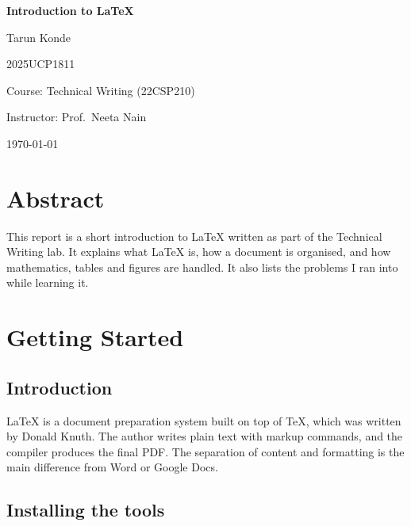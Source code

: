 \documentclass[12pt,a4paper]{report}
\begin{document}
\begin{titlepage}
    \thispagestyle{empty}
    \centering
    \vspace*{3cm}
    {\Huge\bfseries Introduction to \LaTeX\par}
    \vspace{2cm}
    {\Large Tarun Konde\par}
    \vspace{0.4cm}
    {\large 2025UCP1811\par}
    \vspace{2cm}
    {\large Course: Technical Writing (22CSP210)\par}
    \vspace{0.3cm}
    {\large Instructor: Prof.\ Neeta Nain\par}
    \vfill
    {\large \today\par}
\end{titlepage}

\chapter*{Abstract}
This report is a short introduction to \LaTeX{} written as part of the
Technical Writing lab. It explains what \LaTeX{} is, how a document is
organised, and how mathematics, tables and figures are handled. It also lists
the problems I ran into while learning it.

\chapter{Getting Started}

\section{Introduction}

\LaTeX{} is a document preparation system built on top of \TeX, which was
written by Donald Knuth. The author writes plain text with markup commands, and
the compiler produces the final PDF. The separation of content and formatting
is the main difference from Word or Google Docs.

\section{Installing the tools}
\end{document}
